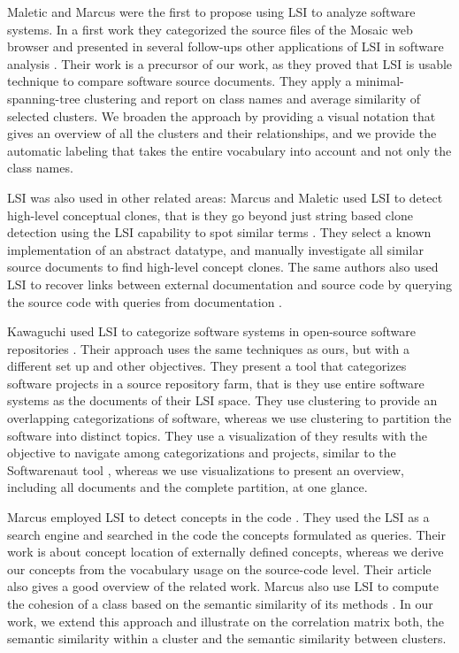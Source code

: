 Maletic and Marcus were the first to propose using LSI to analyze software systems. In a first work they categorized the source files of the Mosaic web browser and presented in several follow-ups other applications of LSI in software analysis \cite{Male00a}. Their work is a precursor of our work, as they proved that LSI is usable technique to compare software source documents. They apply a minimal-spanning-tree clustering and report on class names and average similarity of selected clusters. We broaden the approach by providing a visual notation that gives an overview of all the clusters and their relationships, and we provide the automatic labeling that takes the entire vocabulary into account and not only the class names.

LSI was also used in other related areas: Marcus and Maletic used LSI to detect high-level conceptual clones, that is they go beyond just string based clone detection using the LSI capability to spot similar terms \cite{Marc01a}. They
select a known implementation of an abstract datatype, and manually investigate all similar source documents to find high-level concept clones. The same authors also used LSI to recover links between external documentation and source code by querying the source code with queries from documentation \cite{Marc03b}.

Kawaguchi \etal used LSI to categorize software systems in open-source software repositories \cite{Kawa04a}. Their approach uses the same techniques as ours, but with a different set up and other objectives. They present a tool that categorizes software projects in a source repository farm, that is they use entire software systems as the documents of their LSI space. They use clustering to provide an overlapping categorizations of software, whereas we use clustering to partition the software into distinct topics. They use a visualization of they results with the objective to navigate among categorizations and projects, similar to the Softwarenaut tool \cite{Lung06a}, whereas we use visualizations to present an overview, including all documents and the complete partition, at one glance.

Marcus \etal employed LSI to detect concepts in the code \cite{Marc04a}. They used the LSI as a search engine and searched in the code the concepts formulated as queries. Their work is about concept location of externally defined concepts, whereas we derive our concepts from the vocabulary usage on the source-code level. Their  article also gives a good overview of the related work. Marcus \etal also use LSI to compute the cohesion of a class based on the semantic similarity of its methods \cite{Marc05a}. In our work, we extend this approach and illustrate on the correlation matrix both, the semantic similarity within a cluster and the semantic similarity between clusters.

